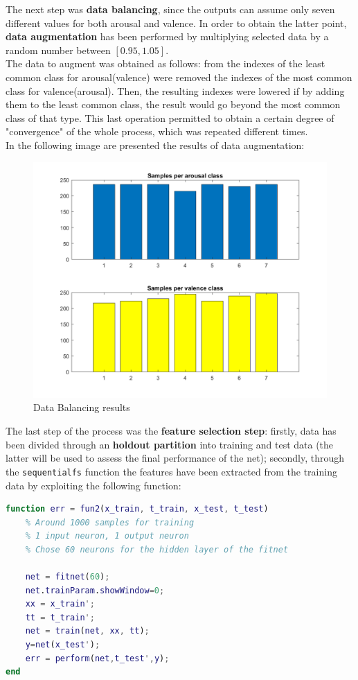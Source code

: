 The next step was \textbf{data balancing}, since the outputs can assume only seven different values for both arousal and valence. In order to obtain the latter point, \textbf{data augmentation} has been performed by multiplying selected data by a random number between \([0.95, 1.05]\).\\
The data to augment was obtained as follows: from the indexes of the least common class for arousal(valence) were removed the indexes of the most common class for valence(arousal). Then, the resulting indexes were lowered if by adding them to the least common class, the result would go beyond the most common class of that type. This last operation permitted to obtain a certain degree of "convergence" of the whole process, which was repeated different times. \\
In the following image are presented the results of data augmentation:  
\begin{figure}[H]
	\centering
	\includegraphics[width=0.7\linewidth]{img/bar_plot_arousal_valence.png}
	\caption{Data Balancing results}
\end{figure}
The last step of the process was the \textbf{feature selection step}: firstly, data has been divided through an \textbf{holdout partition} into training and test data (the latter will be used to assess the final performance of the net); secondly, through the \verb|sequentialfs| function the features have been extracted from the training data by exploiting the following function:


\begin{lstlisting}[language=Matlab]
function err = fun2(x_train, t_train, x_test, t_test)
	% Around 1000 samples for training
	% 1 input neuron, 1 output neuron
	% Chose 60 neurons for the hidden layer of the fitnet
	
	net = fitnet(60);
	net.trainParam.showWindow=0;
	xx = x_train';
	tt = t_train';
	net = train(net, xx, tt);
	y=net(x_test'); 
	err = perform(net,t_test',y);
end
\end{lstlisting}

